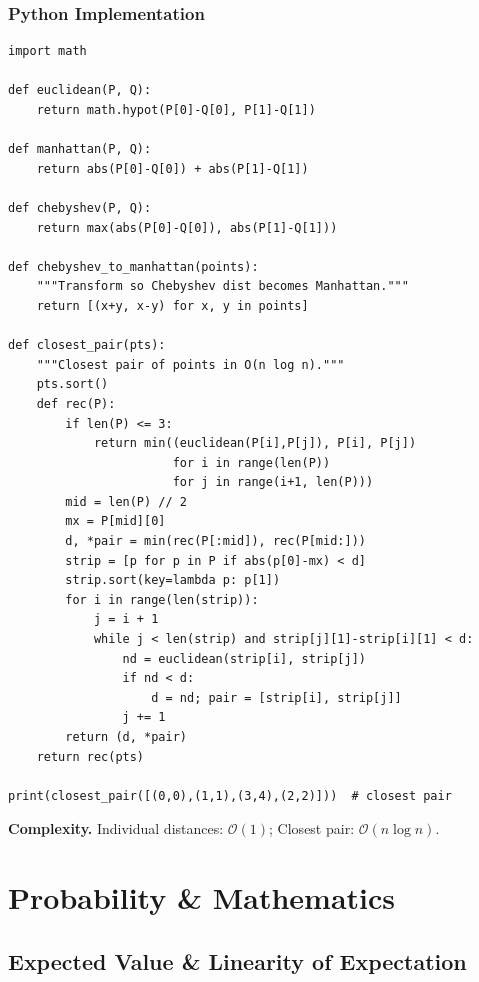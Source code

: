 \documentclass[10pt,a4paper]{article}
\theoremstyle{cpstyle}
\newcommand{\bigO}[1]{\mathcal{O}\!\left(#1\right)}
\begin{document}
\subsubsection{Python Implementation}
\begin{lstlisting}[caption={Distance formulas and closest pair}]
import math

def euclidean(P, Q):
    return math.hypot(P[0]-Q[0], P[1]-Q[1])

def manhattan(P, Q):
    return abs(P[0]-Q[0]) + abs(P[1]-Q[1])

def chebyshev(P, Q):
    return max(abs(P[0]-Q[0]), abs(P[1]-Q[1]))

def chebyshev_to_manhattan(points):
    """Transform so Chebyshev dist becomes Manhattan."""
    return [(x+y, x-y) for x, y in points]

def closest_pair(pts):
    """Closest pair of points in O(n log n)."""
    pts.sort()
    def rec(P):
        if len(P) <= 3:
            return min((euclidean(P[i],P[j]), P[i], P[j])
                       for i in range(len(P))
                       for j in range(i+1, len(P)))
        mid = len(P) // 2
        mx = P[mid][0]
        d, *pair = min(rec(P[:mid]), rec(P[mid:]))
        strip = [p for p in P if abs(p[0]-mx) < d]
        strip.sort(key=lambda p: p[1])
        for i in range(len(strip)):
            j = i + 1
            while j < len(strip) and strip[j][1]-strip[i][1] < d:
                nd = euclidean(strip[i], strip[j])
                if nd < d:
                    d = nd; pair = [strip[i], strip[j]]
                j += 1
        return (d, *pair)
    return rec(pts)

print(closest_pair([(0,0),(1,1),(3,4),(2,2)]))  # closest pair
\end{lstlisting}

\textbf{Complexity.} Individual distances: $\bigO{1}$; Closest pair: $\bigO{n \log n}$.

\clearpage
\section{Probability \& Mathematics}

\subsection{Expected Value \& Linearity of Expectation}
\end{document}
